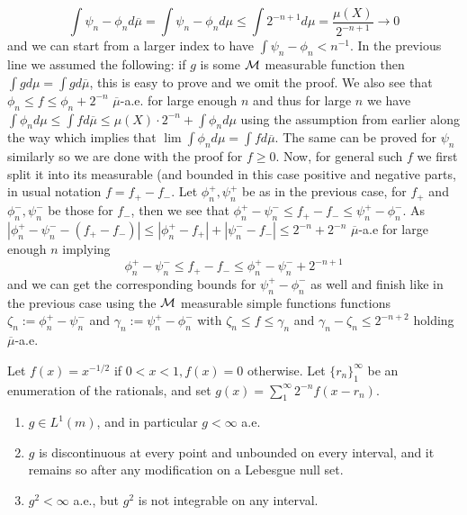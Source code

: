 \documentclass[12pt,a4paper]{article}
\begin{document}
\begin{solution}
$$\int \psi_n-\phi_nd\overline{\mu}=\int\psi_n-\phi_nd\mu\leq\int2^{-n+1}d\mu=\frac{\mu(X)}{2^{-n+1}}\longrightarrow 0$$
and we can start from a larger index to have $\int\psi_n-\phi_n<n^{-1}.$ 
In the previous line we assumed the following: if $g$ is some $\mathcal{M}$ measurable function then $\int gd\mu=\int gd\overline{\mu}$, this is easy to prove and we omit the proof. 
We also see that $\phi_n\leq f\leq \phi_n+2^{-n}$ $\overline{\mu}$-a.e. for large enough $n$ and thus for large $n$ we have $\int\phi_nd\mu\leq\int fd\overline{\mu}\leq\mu(X)\cdot2^{-n}+\int\phi_nd\mu$ using the assumption from earlier along the way which implies that $\lim\int\phi_nd\mu=\int fd\overline{\mu}$. 
The same can be proved for $\psi_n$ similarly so we are done with the proof for $f\geq 0$. 
Now, for general such $f$ we first split it into its measurable (and bounded in this case  positive and negative parts, in usual notation $f=f_+-f_-$. 
Let $\phi_n^+,\psi_n^+$ be as in the previous case, for $f_+$ and $\phi_n^-,\psi_n^-$ be those for $f_-$, then we see that $\phi_n^+-\psi_n^-\leq f_+-f_-\leq\psi_n^+-\phi_n^-$. 
As $|\phi_n^+-\psi_n^--(f_+-f_-)|\leq|\phi_n^+-f_+|+|\psi_n^--f_-|\leq 2^{-n}+2^{-n}$ $\overline{\mu}$-a.e for large enough $n$ implying 
$$\phi_n^+-\psi_n^-\leq f_+-f_-\leq\phi_n^+-\psi_n^-+2^{-n+1}$$
and we can get the corresponding bounds for $\psi_n^+-\phi_n^-$ as well and finish like in the previous case using the $\mathcal{M}$ measurable simple functions functions $\zeta_n:=\phi_n^+-\psi_n^-$ and $\gamma_n:=\psi_n^+-\phi_n^-$ with $\zeta_n\leq f\leq\gamma_n$ and $\gamma_n-\zeta_n\leq 2^{-n+2}$ holding $\overline{\mu}$-a.e.

\end{solution}
\begin{problem}\label{prob:2-25}
Let $f(x) = x^{-1/2}$ if $0 < x < 1, f(x) = 0$ otherwise. Let $\{r_n\}_1^\infty$ be an enumeration of the rationals, and set $g(x) = \sum_1^\infty 2^{-n} f(x - r_n)$.
\begin{enumerate}[label=\alph*.]
    \item $g \in L^1(m)$, and in particular $g < \infty$ a.e.
    \item $g$ is discontinuous at every point and unbounded on every interval, and it remains so after any modification on a Lebesgue null set.
    \item $g^2 < \infty$ a.e., but $g^2$ is not integrable on any interval.
\end{enumerate}
\end{problem}
\end{document}
